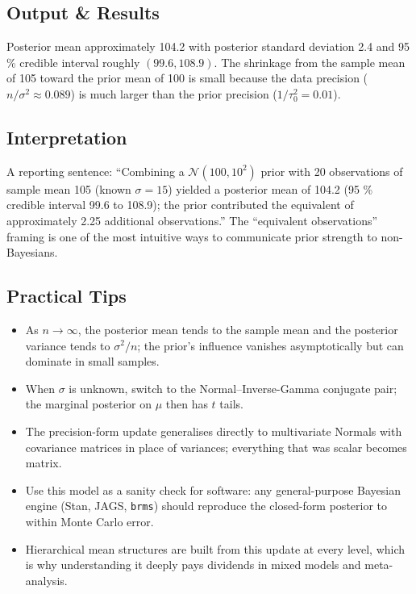 \documentclass[
]{article}
\providecommand{\tightlist}{%
  \setlength{\itemsep}{0pt}\setlength{\parskip}{0pt}}
\begin{document}
\subsection{Output \& Results}\label{output-results}

Posterior mean approximately 104.2 with posterior standard deviation 2.4
and 95 \% credible interval roughly \((99.6, 108.9)\). The shrinkage
from the sample mean of 105 toward the prior mean of 100 is small
because the data precision (\(n / \sigma^2 \approx 0.089\)) is much
larger than the prior precision (\(1 / \tau_0^2 = 0.01\)).

\subsection{Interpretation}\label{interpretation}

A reporting sentence: ``Combining a \(\mathcal N(100, 10^2)\) prior with
20 observations of sample mean 105 (known \(\sigma = 15\)) yielded a
posterior mean of 104.2 (95 \% credible interval 99.6 to 108.9); the
prior contributed the equivalent of approximately 2.25 additional
observations.'' The ``equivalent observations'' framing is one of the
most intuitive ways to communicate prior strength to non-Bayesians.

\subsection{Practical Tips}\label{practical-tips}

\begin{itemize}
\tightlist
\item
  As \(n \to \infty\), the posterior mean tends to the sample mean and
  the posterior variance tends to \(\sigma^2 / n\); the prior's
  influence vanishes asymptotically but can dominate in small samples.
\item
  When \(\sigma\) is unknown, switch to the Normal--Inverse-Gamma
  conjugate pair; the marginal posterior on \(\mu\) then has \(t\)
  tails.
\item
  The precision-form update generalises directly to multivariate Normals
  with covariance matrices in place of variances; everything that was
  scalar becomes matrix.
\item
  Use this model as a sanity check for software: any general-purpose
  Bayesian engine (Stan, JAGS, \texttt{brms}) should reproduce the
  closed-form posterior to within Monte Carlo error.
\item
  Hierarchical mean structures are built from this update at every
  level, which is why understanding it deeply pays dividends in mixed
  models and meta-analysis.
\end{itemize}
\end{document}
